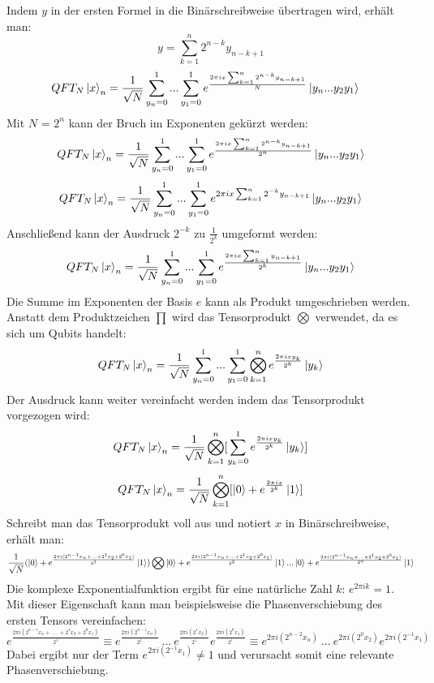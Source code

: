 Indem \(y\) in der ersten Formel in die Binärschreibweise übertragen wird, erhält man:
% 
%
%
\[ y = \sum_{k=1}^{n}2^{n-k} y_{n-k+1}\]  
\begin{align}
  QFT_{N}\ket{x}_{n} &=
    \frac{1}{\sqrt{N}}
    \sum_{y_n=0}^{1} ...
    \sum_{y_1=0}^{1} e^{\frac{2 \pi i x \sum_{k=1}^{n}2^{n-k} y_{n-k+1}}{N}}
    \ket{y_n ... y_{2}y_{1}}
\end{align}
Mit \(N\) = \(2^n\) kann der Bruch im Exponenten gekürzt werden:
\[QFT_{N}\ket{x}_{n} = \frac{1}{\sqrt{N}}\sum_{y_n=0}^{1}...\sum_{y_1=0}^{1}  e^{\frac{2 \pi i x \sum_{k=1}^{n}2^{n-k} y_{n-k+1}}{2^n}}\ket{y_n ... y_{2}y_{1}}\]
\[QFT_{N}\ket{x}_{n} = \frac{1}{\sqrt{N}}\sum_{y_n=0}^{1}...\sum_{y_1=0}^{1}  e^{2 \pi i x \sum_{k=1}^{n}2^{-k} y_{n-k+1}}\ket{y_n ... y_{2}y_{1}}\]
Anschließend kann der Ausdruck \(2^{-k}\) zu \(\frac{1}{2^k}\) umgeformt werden: 
\[QFT_{N}\ket{x}_{n} = \frac{1}{\sqrt{N}}\sum_{y_n=0}^{1}...\sum_{y_1=0}^{1}  e^{\frac{2 \pi i x \sum_{k=1}^{n} y_{n-k+1}}{2^k}}\ket{y_n ... y_{2}y_{1}}\]
Die Summe im Exponenten der Basis \(e\) kann als Produkt umgeschrieben werden.
Anstatt dem Produktzeichen \(\prod\) wird das Tensorprodukt \(\bigotimes\) verwendet, da es sich um Qubits handelt:
\[QFT_{N}\ket{x}_{n} = \frac{1}{\sqrt{N}}\sum_{y_n=0}^{1}...\sum_{y_1=0}^{1} \bigotimes_{k=1}^n{ e^{\frac{2 \pi i x y_k}{2^k}}}\ket{y_{k}}\]
Der Ausdruck kann weiter vereinfacht werden indem das Tensorprodukt vorgezogen wird:
\[QFT_{N}\ket{x}_{n} = \frac{1}{\sqrt{N}}\bigotimes_{k=1}^n [  \sum_{y_k=0}^{1}{ e^{\frac{2 \pi i x y_k}{2^k}}}\ket{y_{k}}]\]
\[QFT_{N}\ket{x}_{n} = \frac{1}{\sqrt{N}}\bigotimes_{k=1}^n [  \ket{0} + { e^{\frac{2 \pi i x}{2^k}}}\ket{1}]\] 
Schreibt man das Tensorprodukt voll aus und notiert \(x\) in Binärschreibweise, erhält man:
\[ 
\frac{1}{\sqrt{N}}
(\ket{0} + 
{ e^{\frac{2 \pi i (2^{n-1}x_n+...+2^1x_2+2^0x_1)}{2^1}}}\ket{1}) \bigotimes
\ket{0} + 
{ e^{\frac{2 \pi i (2^{n-1}x_n+...+2^1x_2+2^0x_1)}{2^2}}}\ket{1}...
\ket{0} + 
{ e^{\frac{2 \pi i (2^{n-1}x_n+...+2^1x_2+2^0x_1)}{2^n}}}\ket{1}\]
Die komplexe Exponentialfunktion ergibt für eine natürliche Zahl \(k\): \(e^{2\pi i k} = 1\).
Mit dieser Eigenschaft kann man beispielsweise die Phasenverschiebung des ersten Tensors vereinfachen:
\[ 
    { e^{\frac{2 \pi i (2^{n-1}x_n+~...~+2^1x_2+2^0x_1)}{2^1}}} \equiv
    {  e^{\frac{2 \pi i (2^{n-1}x_n)}{2^1}}~...~e^{\frac{2 \pi i (2^1x_2)}{2^1}} e^{\frac{2 \pi i (2^0x_1)}{2^1}}  } \equiv 
    {  e^{{2 \pi i (2^{n-2}x_n)}}~...~e^{{2 \pi i (2^0x_2)}} e^{{2 \pi i (2^{-1}x_1)}}  }
    \]
Dabei ergibt nur der Term \(e^{{2 \pi i (2^{-1}x_1)}} \neq 1 \)  
und verursacht somit eine relevante Phasenverschiebung.

